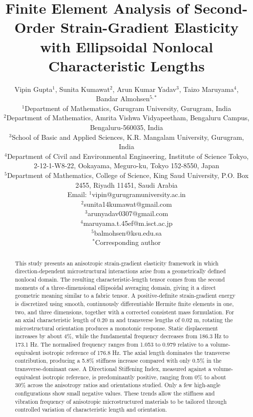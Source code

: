 \documentclass[final,3p,times,fleqn]{elsarticle}
\begin{document}
\begin{frontmatter}

\title{Finite Element Analysis of Second-Order Strain-Gradient Elasticity with Ellipsoidal Nonlocal Characteristic Lengths}


\author{
Vipin Gupta$^{1}$,
Sunita Kumawat$^{2}$,
Arun Kumar Yadav$^{3}$,
Taizo Maruyama$^{4}$,
Bandar Almohsen$^{5,*}$
\\
${}^{1}$Department of Mathematics, Gurugram University, Gurugram, India\\
${}^{2}$Department of Mathematics, Amrita Vishwa Vidyapeetham, Bengaluru Campus, Bengaluru-560035, India\\
${}^{3}$School of Basic and Applied Sciences, K.R. Mangalam University, Gurugram, India\\
${}^{4}$Department of Civil and Environmental Engineering, Institute of Science Tokyo, 2-12-1-W8-22, Ookayama, Meguro-ku, Tokyo 152-8550, Japan\\
${}^{5}$Department of Mathematics, College of Science, King Saud University, P.O. Box 2455, Riyadh 11451, Saudi Arabia\\
Email: $^{1}$vipin@gurugramuniversity.ac.in\\
$^{2}$sunita14kumawat@gmail.com\\
$^{3}$arunyadav0307@gmail.com\\
$^{4}$maruyama.t.45ef@m.isct.ac.jp\\
$^{5}$balmohsen@ksu.edu.sa\\
${}^{*}$Corresponding author
}


\begin{abstract}
This study presents an anisotropic strain-gradient elasticity framework in which direction-dependent microstructural interactions arise from a geometrically defined nonlocal domain. The resulting characteristic-length tensor comes from the second moments of a three-dimensional ellipsoidal averaging domain, giving it a direct geometric meaning similar to a fabric tensor. A positive-definite strain-gradient energy is discretized using smooth, continuously differentiable Hermite finite elements in one, two, and three dimensions, together with a corrected consistent mass formulation. For an axial characteristic length of 0.20 m and transverse lengths of 0.02 m, rotating the microstructural orientation produces a monotonic response. Static displacement increases by about 4\%, while the fundamental frequency decreases from 186.3 Hz to 173.1 Hz. The normalised frequency ranges from 1.053 to 0.979 relative to a volume-equivalent isotropic reference of 176.8 Hz. The axial length dominates the transverse contribution, producing a 5.8\% stiffness increase compared with only 0.5\% in the transverse-dominant case. A Directional Stiffening Index, measured against a volume-equivalent isotropic reference, is predominantly positive, ranging from 0\% to about 30\% across the anisotropy ratios and orientations studied. Only a few high-angle configurations show small negative values. These trends allow the stiffness and vibration frequency of anisotropic microstructured materials to be tailored through controlled variation of characteristic length and orientation.
\end{abstract}



\end{frontmatter}
\end{document}
